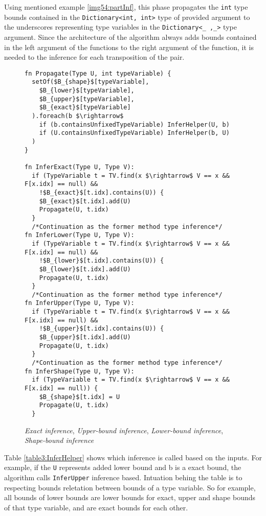 Using mentioned example \ref{img54:partInf}, this phase propagates the \texttt{int} type bounds contained in the \texttt{Dictionary<int, int>} type of provided argument to the underscores representing type variables in the \texttt{Dictionary<\_ ,\_>} type argument.
Since the architecture of the algorithm always adds bounds contained in the left argument of the functions to the right argument of the function, it is needed to the inference for each transposition of the pair.
\begin{figure}[h!]
\begin{lstlisting}[style=myAlgo, mathescape=true]
fn Propagate(Type U, int typeVariable) {
  setOf($B_{shape}$[typeVariable],
    $B_{lower}$[typeVariable],
    $B_{upper}$[typeVariable],
    $B_{exact}$[typeVariable]
  ).foreach(b $\rightarrow$
    if (b.containsUnfixedTypeVariable) InferHelper(U, b)
    if (U.containsUnfixedTypeVariable) InferHelper(b, U)
  )
}

fn InferExact(Type U, Type V):
  if (TypeVariable t = TV.find(x $\rightarrow$ V == x && F[x.idx] == null) &&
    !$B_{exact}$[t.idx].contains(U)) {
    $B_{exact}$[t.idx].add(U)
    Propagate(U, t.idx)
  }
  /*Continuation as the former method type inference*/
fn InferLower(Type U, Type V):
  if (TypeVariable t = TV.find(x $\rightarrow$ V == x && F[x.idx] == null) &&
    !$B_{lower}$[t.idx].contains(U)) {
    $B_{lower}$[t.idx].add(U)
    Propagate(U, t.idx)
  }
  /*Continuation as the former method type inference*/
fn InferUpper(Type U, Type V):
  if (TypeVariable t = TV.find(x $\rightarrow$ V == x && F[x.idx] == null) &&
    !$B_{upper}$[t.idx].contains(U)) {
    $B_{upper}$[t.idx].add(U)
    Propagate(U, t.idx)
  }
  /*Continuation as the former method type inference*/
fn InferShape(Type U, Type V):
  if (TypeVariable t = TV.find(x $\rightarrow$ V == x && F[x.idx] == null)) {
    $B_{shape}$[t.idx] = U
    Propagate(U, t.idx)
  }
\end{lstlisting}
\caption{\textit{Exact inference}, \textit{Upper-bound inference}, \textit{Lower-bound inference}, \textit{Shape-bound inference}}
\label{img55:mainTypeInference2}
\end{figure}
\par
Table \ref{table3:InferHelper} shows which inference is called based on the inputs.
For example, if the \texttt{U} represents added lower bound and b is a exact bound, the algorithm calls \texttt{InferUpper} inference based.
Intuation behing the table is to respecting bounds reletation between bounds of a type variable.
So for example, all bounds of lower bounds are lower bounds for exact, upper and shape bounds of that type variable, and are exact bounds for each other.
